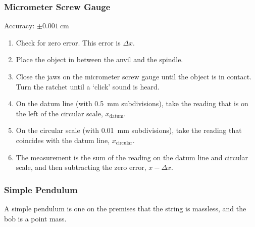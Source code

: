 \documentclass[../main.tex]{subfiles}
\begin{document}
		\subsubsection*{Micrometer Screw Gauge}
		Accuracy: \(\pm \SI{0.001}{\centi\meter}\)
		\begin{enumerate}
			\item Check for zero error. This error is \(\Delta x\).
			\item Place the object in between the anvil and the spindle.
			\item Close the jaws on the micrometer screw gauge until the object is in contact. Turn  the ratchet until a `click' sound is heard.
			\item On the datum line (with \SI{0.5}{\milli\meter} subdivisions), take the reading that is on the left of the circular scale, \(x_{\mathrm{datum}}\).
			\item On the circular scale (with \SI{0.01}{\milli\meter} subdivisions), take the reading that coincides with the datum line, \(x_{\mathrm{circular}}\).
			\item The measurement is the sum of the reading on the datum line and circular scale, and then subtracting the zero error, \(x-\Delta x\).
		\end{enumerate}
	
		\subsubsection{Simple Pendulum}
		A simple pendulum is one on the premises that the string is massless, and the bob is a point mass.
		
		\begin{center}
		\end{center}
		
\end{document}
